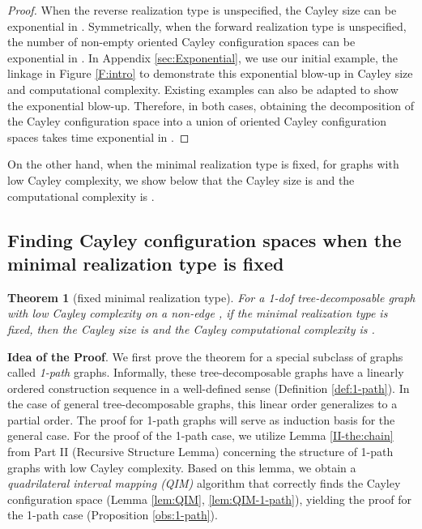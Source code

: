 \documentclass[secthm,amsthm,english]{article}
\newtheorem{theorem}{Theorem}
\theoremstyle{definition}
\theoremstyle{remark}
\begin{document}
\begin{proof}
When the reverse realization type is unspecified, the Cayley size can be exponential in .
Symmetrically, when the forward realization type is unspecified, 
the number of non-empty oriented Cayley configuration spaces can be exponential in . 
In Appendix \ref{sec:Exponential}, we use our initial example, the linkage in Figure \ref{F:intro} 
to demonstrate this exponential blow-up in Cayley size and computational complexity.
Existing examples \cite{bib:Borcea} can also be adapted to show the exponential blow-up. 
Therefore, in both cases, 
obtaining the decomposition of the Cayley configuration space into a union of oriented Cayley configuration spaces
takes time exponential  in .
\end{proof}


On the other hand, when the minimal realization type is fixed, for graphs with low Cayley complexity, 
we show below that the Cayley size is  and the computational complexity is .

\subsection{Finding Cayley configuration spaces when the minimal realization type is fixed}

\begin{theorem}[fixed minimal realization type]\label{obs:k-path}
For a 1-dof tree-decomposable graph with low Cayley complexity on a non-edge , 
if the minimal realization type is fixed, then
the Cayley size is  and the Cayley computational complexity is . 
\end{theorem}


\noindent \textbf{Idea of the Proof}. 
We first prove the theorem for a special subclass of graphs called \emph{1-path} graphs. 
Informally, these tree-decomposable graphs have a linearly ordered construction sequence in a well-defined sense (Definition \ref{def:1-path}). 
In the case of general tree-decomposable graphs, this linear order generalizes to a partial order. 
The proof for 1-path graphs will serve as induction basis for the general case. 
For the proof of the 1-path case, we utilize Lemma \ref{II-the:chain} from Part II (Recursive Structure Lemma) concerning the structure of 1-path graphs with low Cayley complexity. 
Based on this lemma, we obtain a \emph{quadrilateral interval mapping (QIM)} algorithm that correctly finds the Cayley configuration space (Lemma \ref{lem:QIM}, \ref{lem:QIM-1-path}), yielding the proof for the 1-path case (Proposition \ref{obs:1-path}).
\end{document}
